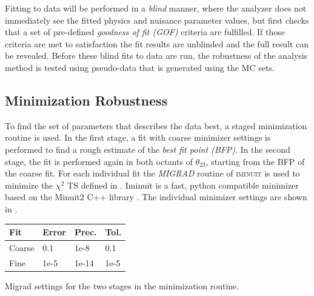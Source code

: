 Fitting to data will be performed in a \textit{blind} manner, where the analyzer does not immediately see the fitted physics and nuisance parameter values, but first checks that a set of pre-defined \textit{goodness of fit (GOF)} criteria are fulfilled. If those criteria are met to satisfaction the fit results are unblinded and the full result can be revealed. Before these blind fits to data are run, the robustness of the analysis method is tested using pseudo-data that is generated using the MC sets.


\subsection{Minimization Robustness} 

To find the set of parameters that describes the data best, a staged minimization routine is used. In the first stage, a fit with coarse minimizer settings is performed to find a rough estimate of the \textit{best fit point (BFP)}. In the second stage, the fit is performed again in both octants of $\theta_{23}$, starting from the BFP of the coarse fit. For each individual fit the \textit{MIGRAD} routine of \textsc{iminuit}  is used to minimize the $\chi^2$ TS defined in . Iminuit is a fast, python compatible minimizer based on the Minuit2 C++ library . The individual minimizer settings are shown in .

\begin{margintable}
    \small
        \begin{tabular}{ llll }
        \hline\hline

        \textbf{Fit} & \textbf{Error} & \textbf{Prec.} & \textbf{Tol.} \\
        
        \hline\hline
    
        Coarse & 0.1 & 1e-8 & 0.1 \\
        Fine & 1e-5 & 1e-14 & 1e-5 \\
    
        \hline
        \end{tabular}
    \caption[Staged minimization settings]{Migrad settings for the two stages in the minimization routine.}
\end{margintable}

